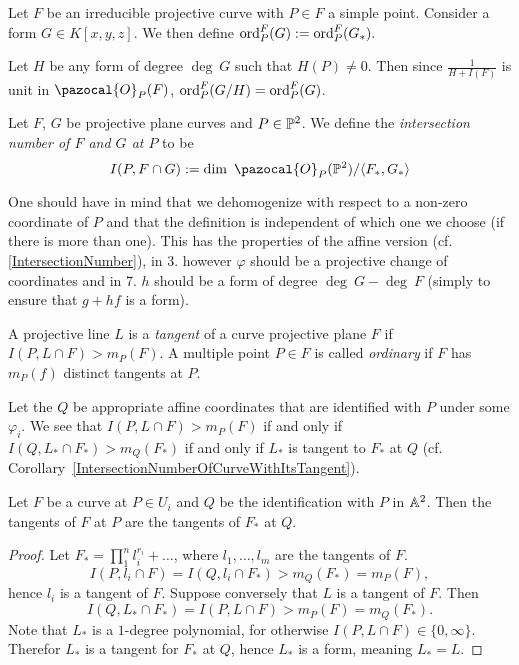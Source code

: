     \begin{definition}
        Let $F$ be an irreducible projective curve with $P\in F$ a simple point. Consider a form $G\in K[x,y,z]$. We then define $\mathrm{ord}_P^F(G):= \mathrm{ord}_P^F(G_\ast).$
    \end{definition}
    \begin{remark}
        Let $H$ be any form of degree $\deg \ G$ such that $H(P)\neq 0$. Then since $\frac{1}{H+I(F)}$ is unit in $\pazocal{O}_P(F)$, $\mathrm{ord}_P^F(G/H)=\mathrm{ord}_P^F(G)$.
    \end{remark}
    \begin{definition}
        Let $F$, $G$ be projective plane curves and $P\in \mathbb{P}^2$. We define the \textit{intersection number of $F$ and $G$ at $P$} to be 
        $$I(P,F\cap G) := \dim \ \pazocal{O}_P(\Pp^2)/\langle F_\ast,G_\ast\rangle$$
    \end{definition}
    \begin{remark}
        One should have in mind that we dehomogenize with respect to a non-zero coordinate of $P$ and that the definition is independent of which one we choose (if there is more than one). This has the properties of the affine version (cf. \ref{IntersectionNumber}), in 3. however $\varphi$ should be a projective change of coordinates and in 7. $h$ should be a form of degree $\deg \ G-\deg \ F$ (simply to ensure that $g+hf$ is a form).  
    \end{remark}
    \begin{definition}
        A projective line $L$ is a \textit{tangent} of a curve projective plane $F$ if $I(P,L\cap F)>m_P(F)$. A multiple point $P\in F$ is called \textit{ordinary} if $F$ has $m_P(f)$ distinct tangents at $P$.
    \end{definition}
    \begin{remark}
        Let the $Q$ be appropriate affine coordinates that are identified with $P$ under some $\varphi_i$. We see that $I(P,L\cap F)>m_P(F)$ if and only if $I(Q,L_\ast\cap F_\ast)>m_Q(F_\ast)$ if and only if $L_\ast$ is tangent to $F_\ast$ at $Q$ (cf. Corollary~\ref{IntersectionNumberOfCurveWithItsTangent}). 
    \end{remark}
    \begin{proposition}
        Let $F$ be a curve at $P\in U_i$ and $Q$ be the identification with $P$ in $\mathbb{A}^2$. Then the tangents of $F$ at $P$ are the tangents of $F_\ast$ at $Q$. 
    \end{proposition}
    \begin{proof}
        Let $F_\ast = \prod_1^n l_i^{r_i} + \dots$, where $l_1,\dots,l_m$ are the tangents of $F$. 
        $$I(P,l_i\cap F)=I(Q,l_i\cap F_\ast) > m_Q(F_\ast)= m_P(F),$$
        hence $l_i$ is a tangent of $F$. Suppose conversely that $L$ is a tangent of $F$. Then 
        $$I(Q, L_\ast \cap F_\ast)=I(P,L\cap F) >m_P(F)=m_Q(F_\ast).$$
        Note that $L_\ast$ is a $1$-degree polynomial, for otherwise $I(P,L\cap F)\in\{0,\infty\}$. Therefor $L_\ast$ is a tangent for $F_\ast$ at $Q$, hence $L_\ast$ is a form, meaning $L_\ast = L$.
    \end{proof} 
